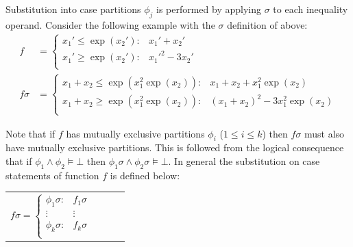 \documentclass[twoside,11pt]{article}
\begin{document}
Substitution into case partitions $\phi_j$ is performed 
by applying $\sigma$ to each inequality operand. Consider the following example with the $\sigma$ definition of above: 
\begin{align*}
f &= \begin{cases}
 x_1' \leq \exp(x_2'): & x_1' + x_2' \\ 
 x_1' \geq \exp(x_2'): & x_1'^2 - 3x_2' \\ 
\end{cases}
\\
f \sigma &= \begin{cases}
 x_1 + x_2 \leq \exp(x_1^2 \exp(x_2)): & x_1 + x_2 + x_1^2 \exp(x_2) \\ 
 x_1 + x_2 \geq \exp(x_1^2 \exp(x_2)): & (x_1 + x_2)^2 - 3x_1^2 \exp(x_2) \\ 
\end{cases}
\end{align*}

Note that if $f$ has mutually exclusive partitions $\phi_i$ ($1 \leq i \leq k$)
then $f\sigma$ must also have mutually exclusive partitions. 
This is followed from the logical consequence that 
if $\phi_1 \land \phi_2 \models \bot$
then $\phi_1\sigma \land \phi_2\sigma \models \bot$.
In general the substitution on case statements of function $f$ is 
defined below:
{%
\begin{center}
\begin{tabular}{r c c l}
\hspace{-2mm}
  $f\sigma = \begin{cases}
    \phi_1\sigma: & f_1\sigma \\ 
   \vdots&\vdots\\ 
    \phi_k\sigma: & f_k\sigma \\ 
  \end{cases}$
\end{tabular}
\end{center}
}
\end{document}
